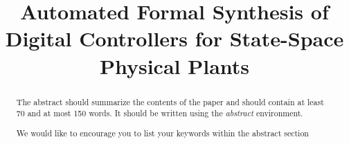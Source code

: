 \documentclass[runningheads,a4paper]{llncs}
\newcommand{\keywords}[1]{\par\addvspace\baselineskip
\noindent\keywordname\enspace\ignorespaces#1}
\begin{document}
\mainmatter  %

\title{Automated Formal Synthesis of Digital Controllers for State-Space Physical Plants} 


%
%
%


%
%

\maketitle


\begin{abstract}
The abstract should summarize the contents of the paper and should
contain at least 70 and at most 150 words. It should be written using the
\emph{abstract} environment.
\keywords{We would like to encourage you to list your keywords within
the abstract section}
\end{abstract}
\end{document}
